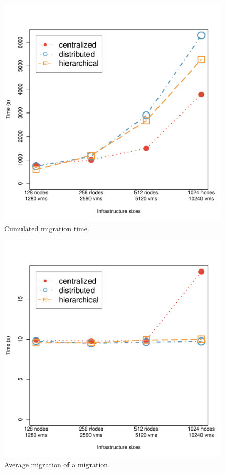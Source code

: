 \begin{figure}[ht]
\begin{center}
    \includegraphics[width=.65\linewidth]{figures/experiments/migration_time.pdf}
    \caption{Cumulated migration time.}
\end{center}
\label{fig:experiments_violation_time}
\end{figure}


\begin{figure}[ht]
\begin{center}
    \includegraphics[width=.65\linewidth]{figures/experiments/migration_avg_duration.pdf}
    \caption{Average migration of a migration.}
\end{center}
\label{fig:experiments_migration_time}
\end{figure}

